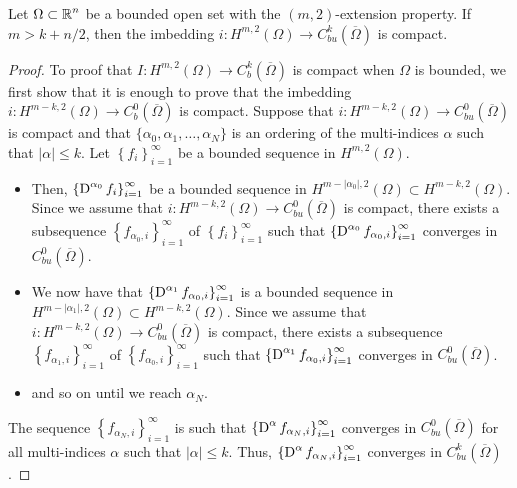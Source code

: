 \begin{cor} \label{sob_cor_sob_lem}
Let $\displaystyle \Omega \subset \mathbb{R}^n$ be a bounded open set with
the $(m,2)$-extension property. If $m>k +n/2$, then the imbedding
$\displaystyle i:H^{m,2}(\Omega) \to C_{bu}^k(\overline{\Omega})$
is compact.
\end{cor}

\begin{proof}
 To proof that $\displaystyle I: H^{m,2}(\Omega) \to
C^k_b(\overline{\Omega})$ is compact when $\Omega$ is bounded, we first
show that it is enough to prove that the imbedding
$\displaystyle i: H^{m-k,2}(\Omega) \to C^0_b(\overline{\Omega})$ is
compact. Suppose that
$\displaystyle i: H^{m-k,2}(\Omega) \to C_{bu}^0(\overline{\Omega})$
is compact and that $\{\alpha_0 , \alpha_1, \ldots, \alpha_N\}$ is an
ordering of the multi-indices $\alpha$ such that $|\alpha| \leq k$.
Let $\displaystyle \left\{ f_i \right\}_{i=1}^\infty$ be a bounded
sequence in $\displaystyle H^{m,2}(\Omega)$.
\begin{itemize}
\item Then,
$\displaystyle \left\{ \operatorname{D}^{\alpha_0} f_i \right\}_{i=1}^\infty$ be a bounded
sequence in
$\displaystyle H^{m-|\alpha_0|,2}(\Omega) \subset H^{m-k,2}(\Omega)$.
Since we assume that
$\displaystyle i: H^{m-k,2}(\Omega) \to C_{bu}^0(\overline{\Omega})$
is compact, there exists a subsequence
$\displaystyle \left\{ f_{\alpha_0,i} \right\}_{i=1}^\infty$
of $\displaystyle \left\{ f_i \right\}_{i=1}^\infty$
such that
$\displaystyle \left\{ \operatorname{D}^{\alpha_0} f_{\alpha_0,i} \right\}_{i=1}^\infty$
converges in $\displaystyle C_{bu}^0(\overline{\Omega})$.
\item We now have that
$\displaystyle \left\{ \operatorname{D}^{\alpha_1} f_{\alpha_0,i}
\right\}_{i=1}^\infty$ is
a bounded sequence in
$\displaystyle H^{m-|\alpha_1|,2}(\Omega) \subset H^{m-k,2}(\Omega)$.
Since we assume that
$\displaystyle i: H^{m-k,2}(\Omega) \to C_{bu}^0(\overline{\Omega})$
is compact, there exists a subsequence
$\displaystyle \left\{ f_{\alpha_1,i} \right\}_{i=1}^\infty$
of $\displaystyle \left\{ f_{\alpha_0,i} \right\}_{i=1}^\infty$
such that
$\displaystyle \left\{ \operatorname{D}^{\alpha_1} f_{\alpha_0,i} \right\}_{i=1}^\infty$
converges in $\displaystyle C_{bu}^0(\overline{\Omega})$.
\item and so on until we reach $\alpha_N$.
\end{itemize}
The sequence
$\displaystyle \left\{ f_{\alpha_N,i} \right\}_{i=1}^\infty$ is such
that
$\displaystyle \left\{ \operatorname{D}^\alpha f_{\alpha_N,i} \right\}_{i=1}^\infty$
converges in $C_{bu}^0(\overline{\Omega})$ for all multi-indices $\alpha$
such that $|\alpha|\leq k$.  Thus,
$\displaystyle \left\{ \operatorname{D}^\alpha f_{\alpha_N,i} \right\}_{i=1}^\infty$
converges in $C_{bu}^k(\overline{\Omega})$.


\end{proof}
